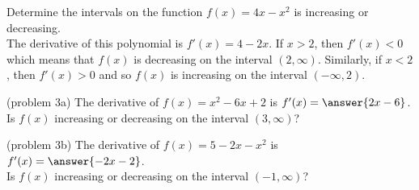 \documentclass{ximera}
\begin{document}
\begin{example}[example 3]
Determine the intervals on the function $f(x) = 4x - x^2$ is increasing or decreasing.\\
The derivative of this polynomial is $f'(x) = 4 -  2x$. If $x > 2$, then $f'(x) <0$ which means that $f(x)$ is decreasing on the interval $(2, \infty)$.
Similarly, if $x<2$, then $f'(x) >0$ and so $f(x)$ is increasing on the interval $(-\infty, 2)$.
\begin{image}
\end{image}

\end{example}

\begin{problem}(problem 3a)
The derivative of $f(x)=x^2 - 6x + 2$ is $f'(x) = \answer{2x-6}$.\\
Is $f(x)$ increasing or decreasing on the interval $(3, \infty)$?
\begin{multipleChoice}
\end{multipleChoice}
\end{problem}


\begin{problem}(problem 3b)
The derivative of $f(x)=5 - 2x - x^2$ is $f'(x) = \answer{-2x-2}$.\\
Is $f(x)$ increasing or decreasing on the interval $(-1, \infty)$?
\begin{multipleChoice}
\end{multipleChoice}
\end{problem}
\end{document}
